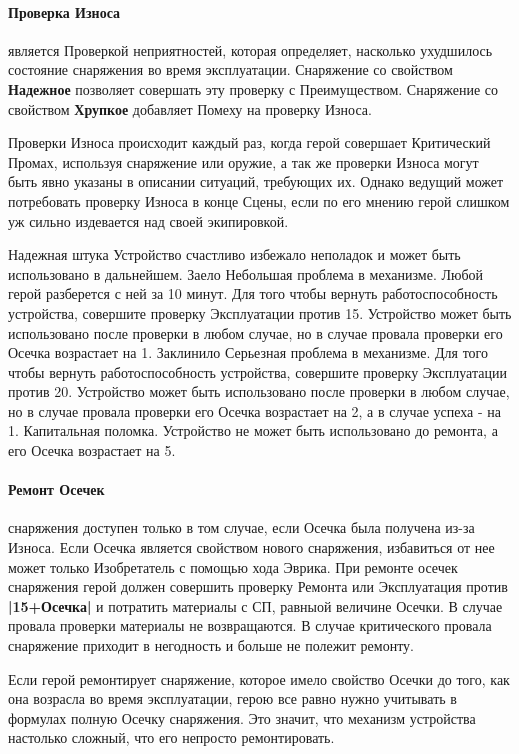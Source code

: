 \paragraph{Проверка Износа} является Проверкой неприятностей, которая определяет, насколько ухудшилось состояние снаряжения во время эксплуатации.
\newline Снаряжение со свойством \textbf{Надежное} позволяет совершать эту проверку с Преимуществом.
\newline Снаряжение со свойством \textbf{Хрупкое} добавляет Помеху на проверку Износа.
\begin{tcolorbox}
Проверки Износа происходит каждый раз, когда герой совершает Критический Промах, используя снаряжение или оружие, а так же проверки Износа могут быть явно указаны в описании ситуаций, требующих их. Однако ведущий может потребовать проверку Износа в конце Сцены, если по его мнению герой слишком уж сильно издевается над своей экипировкой.
\end{tcolorbox}
\trouble
{Надежная штука}%
{Устройство счастливо избежало неполадок и может быть использовано в дальнейшем.}%
{Заело}%
{Небольшая проблема в механизме. Любой герой разберется с ней за 10 минут. Для того чтобы вернуть работоспособность устройства, совершите проверку Эксплуатации против 15. Устройство может быть использовано после проверки в любом случае, но в случае провала проверки его Осечка возрастает на 1.}%
{Заклинило}%
{Серьезная проблема в механизме. Для того чтобы вернуть работоспособность устройства, совершите проверку Эксплуатации против 20. Устройство может быть использовано после проверки в любом случае, но в случае провала проверки его Осечка возрастает на 2, а в случае успеха - на 1.}%
{Капитальная поломка.}%
{Устройство не может быть использовано до ремонта, а его Осечка возрастает на 5.}%
\paragraph{Ремонт Осечек} снаряжения доступен только в том случае, если Осечка была получена из-за Износа. Если Осечка является свойством нового снаряжения, избавиться от нее может только Изобретатель с помощью хода Эврика.
\newline
При ремонте осечек снаряжения герой должен совершить проверку Ремонта или Эксплуатация против \textbf{|15+Осечка|} и потратить материалы с СП, равныой величине Осечки. В случае провала проверки материалы не возвращаются. В случае критического провала снаряжение приходит в негодность и больше не полежит ремонту.
\begin{tcolorbox}
Если герой ремонтирует снаряжение, которое имело свойство Осечки до того, как она возрасла во время эксплуатации, герою все равно нужно учитывать в формулах полную Осечку снаряжения. Это значит, что механизм устройства настолько сложный, что его непросто ремонтировать.
\end{tcolorbox}
